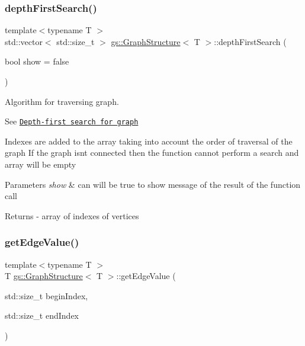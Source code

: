 \subsubsection{\texorpdfstring{depth\+First\+Search()}{depthFirstSearch()}}
{\footnotesize\ttfamily template$<$typename T $>$ \\
std\+::vector$<$ std\+::size\+\_\+t $>$ \mbox{\hyperlink{classgs_1_1_graph_structure}{gs\+::\+Graph\+Structure}}$<$ T $>$\+::depth\+First\+Search (\begin{DoxyParamCaption}\item[{bool}]{show = {\ttfamily false} }\end{DoxyParamCaption})}



Algorithm for traversing graph. 

See \href{https://en.wikipedia.org/wiki/Depth-first_search}{\tt Depth-\/first search for graph}

Indexes are added to the array taking into account the order of traversal of the graph If the graph isn\textquotesingle{}t connected then the function cannot perform a search and array will be empty 
\begin{DoxyParams}{Parameters}
{\em show} & can will be true to show message of the result of the function call \\
\hline
\end{DoxyParams}
\begin{DoxyReturn}{Returns}
-\/ array of indexes of vertices 
\end{DoxyReturn}
\mbox{\label{classgs_1_1_graph_structure_ac2e23f51a131b5a08d96cb8c75f20cea}} 
\subsubsection{\texorpdfstring{get\+Edge\+Value()}{getEdgeValue()}}
{\footnotesize\ttfamily template$<$typename T $>$ \\
T \mbox{\hyperlink{classgs_1_1_graph_structure}{gs\+::\+Graph\+Structure}}$<$ T $>$\+::get\+Edge\+Value (\begin{DoxyParamCaption}\item[{std\+::size\+\_\+t}]{begin\+Index,  }\item[{std\+::size\+\_\+t}]{end\+Index }\end{DoxyParamCaption})}


